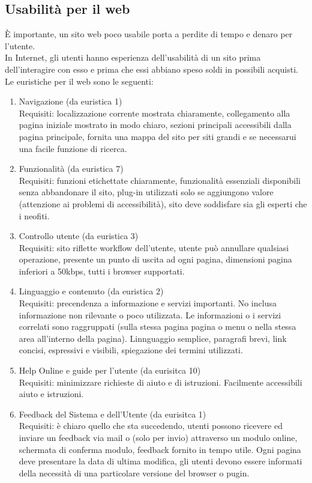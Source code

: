 \documentclass{article}
\begin{document}
\subsection{Usabilità per il web}
È importante, un sito web poco usabile porta a perdite di tempo e denaro per l'utente.\\
In Internet, gli utenti hanno esperienza dell'usabilità di un sito prima dell'interagire con esso e prima che essi abbiano speso soldi in possibili acquisti.\\
Le euristiche per il web sono le seguenti:
\begin{enumerate}
	\item Navigazione (da euristica 1)\\
	Requisiti: localizzazione corrente mostrata chiaramente, collegamento alla pagina iniziale mostrato in modo chiaro, sezioni principali accessibili dalla pagina principale, fornita una mappa del sito per siti grandi e se necessarui una facile funzione di ricerca.
	\item Funzionalità (da euristica 7)\\
	Requisiti: funzioni etichettate chiaramente, funzionalità essenziali disponibili senza abbandonare il sito, plug-in utilizzati solo se aggiungono valore (attenzione ai problemi di accessibilità), sito deve soddisfare sia gli esperti che i neofiti.
	\item Controllo utente (da euristica 3)\\
	Requisiti: sito riflette workflow dell'utente, utente può annullare qualsiasi operazione, presente un punto di uscita ad ogni pagina, dimensioni pagina inferiori a 50kbps, tutti i browser supportati.
	\item Linguaggio e contenuto (da euristica 2)\\
	Requisiti: precendenza a informazione e servizi importanti. No inclusa informazione non rilevante o poco utilizzata. Le informazioni o i servizi correlati sono raggruppati (sulla stessa pagina pagina o menu o nella stessa area all'interno della pagina). Linnguaggio semplice, paragrafi brevi, link concisi, espressivi e visibili, spiegazione dei termini utilizzati.
	\item Help Online e guide per l'utente (da eurisitca 10)\\
	Requisiti: minimizzare richieste di aiuto e di istruzioni. Facilmente accessibili aiuto e istruzioni.
	\item Feedback del Sistema e dell'Utente (da eurisitca 1)\\
	Requisiti: è chiaro quello che sta succedendo, utenti possono ricevere ed inviare un feedback via mail o (solo per invio) attraverso un modulo online, schermata di conferma modulo, feedback fornito in tempo utile. Ogni pagina deve presentare la data di ultima modifica, gli utenti devono essere informati della necessità di una particolare versione del browser o pugin.

\end{enumerate}
\end{document}
